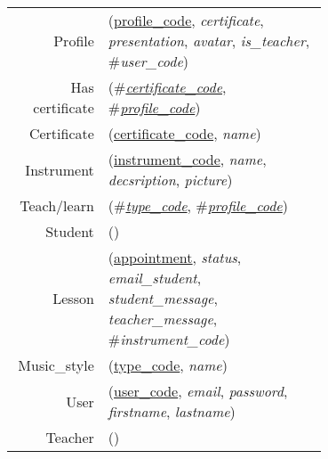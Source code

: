 
\usepackage[normalem]{ulem}
\newenvironment{mld}
  {\par\begin{minipage}{\linewidth}\begin{tabular}{rp{0.7\linewidth}}}
  {\end{tabular}\end{minipage}\par}
\newcommand{\relat}[1]{\textsc{#1}}
\newcommand{\attr}[1]{\emph{#1}}
\newcommand{\prim}[1]{\uline{#1}}
\newcommand{\foreign}[1]{\#\textsl{#1}}


\begin{mld}
  Profile & (\prim{profile\_code}, \attr{certificate}, \attr{presentation}, \attr{avatar}, \attr{is\_teacher}, \foreign{user\_code})\\
  Has certificate & (\foreign{\prim{certificate\_code}}, \foreign{\prim{profile\_code}})\\
  Certificate & (\prim{certificate\_code}, \attr{name})\\
  Instrument & (\prim{instrument\_code}, \attr{name}, \attr{decsription}, \attr{picture})\\
  Teach/learn & (\foreign{\prim{type\_code}}, \foreign{\prim{profile\_code}})\\
  Student & ()\\
  Lesson & (\prim{appointment}, \attr{status}, \attr{email\_student}, \attr{student\_message}, \attr{teacher\_message}, \foreign{instrument\_code})\\
  Music\_style & (\prim{type\_code}, \attr{name})\\
  User & (\prim{user\_code}, \attr{email}, \attr{password}, \attr{firstname}, \attr{lastname})\\
  Teacher & ()\\
\end{mld}